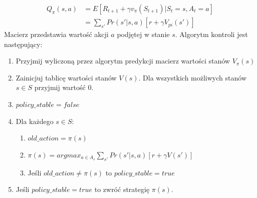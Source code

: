 \documentclass[12pt]{book}
\begin{document}
\begin{equation}
\begin{split}
Q_{\pi}(s,a) &= E[R_{t+1}+\gamma v_{\pi}(S_{t+1}) | S_t=s, A_t=a]  \\
           &= \sum_{s'}Pr(s'|s,a)[r+\gamma V_{pi}(s')] 
\end{split}
\end{equation}
Macierz przedstawia wartość akcji $a$ podjętej w stanie $s$. Algorytm kontroli jest następujący:
\begin{enumerate}
\item{Przyjmij wyliczoną przez algorytm predykcji macierz wartości stanów $V_{\pi}(s)$}
\item{Zainicjuj tablicę wartości stanów $V(s)$. Dla wszystkich możliwych stanów $s \in S$ przyjmij wartość $0$.}
\item{$policy\_stable=false$}
\item{Dla każdego $s \in S$:}
  \begin{enumerate}
    \item $old\_action=\pi(s)$
    \item $\pi(s)=argmax_{a\in A_s} \sum_{s'}Pr(s'|s,a)[r+\gamma V(s')]$
    \item Jeśli $old\_action \neq \pi(s)$ to $policy\_stable = true$
  \end{enumerate}
\item Jeśli $policy\_stable=true$ to zwróć strategię $\pi(s)$.
\end{enumerate}


\end{document}
